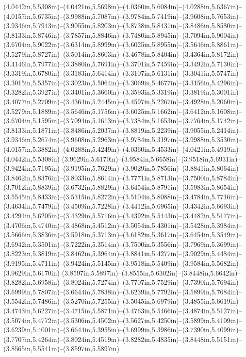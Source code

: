 (4.0442in,5.5308in)--(4.0421in,5.5698in)--(4.0360in,5.6084in)--(4.0288in,5.6367in)--(4.0157in,5.6735in)--(3.9988in,5.7087in)--(3.9784in,5.7419in)--(3.9608in,5.7653in)--(3.9346in,5.7943in)--(3.9055in,5.8203in)--(3.8738in,5.8431in)--(3.8486in,5.8580in)--(3.8133in,5.8746in)--(3.7857in,5.8846in)--(3.7480in,5.8945in)--(3.7094in,5.9004in)--(3.6704in,5.9022in)--(3.6314in,5.8999in)--(3.6025in,5.8955in)--(3.5646in,5.8861in)--(3.5279in,5.8727in)--(3.5014in,5.8603in)--(3.4678in,5.8404in)--(3.4364in,5.8172in)--(3.4146in,5.7977in)--(3.3880in,5.7691in)--(3.3701in,5.7459in)--(3.3492in,5.7130in)--(3.3319in,5.6780in)--(3.3183in,5.6414in)--(3.3107in,5.6131in)--(3.3041in,5.5747in)--(3.3015in,5.5357in)--(3.3023in,5.5064in)--(3.3069in,5.4677in)--(3.3156in,5.4296in)--(3.3282in,5.3927in)--(3.3401in,5.3660in)--(3.3593in,5.3319in)--(3.3819in,5.3001in)--(3.4077in,5.2709in)--(3.4364in,5.2445in)--(3.4597in,5.2267in)--(3.4928in,5.2060in)--(3.5279in,5.1889in)--(3.5646in,5.1756in)--(3.6025in,5.1662in)--(3.6412in,5.1608in)--(3.6704in,5.1595in)--(3.7094in,5.1613in)--(3.7384in,5.1653in)--(3.7764in,5.1742in)--(3.8133in,5.1871in)--(3.8486in,5.2037in)--(3.8819in,5.2239in)--(3.9055in,5.2414in)--(3.9346in,5.2674in)--(3.9608in,5.2963in)--(3.9784in,5.3197in)--(3.9988in,5.3530in)--(4.0157in,5.3882in)--(4.0288in,5.4249in)--(4.0360in,5.4533in)--(4.0421in,5.4919in)--(4.0442in,5.5308in) (3.9629in,5.6170in)--(3.9584in,5.6658in)--(3.9518in,5.6931in)--(3.9424in,5.7195in)--(3.9195in,5.7629in)--(3.9029in,5.7856in)--(3.8841in,5.8064in)--(3.8462in,5.8376in)--(3.8033in,5.8614in)--(3.7771in,5.8713in)--(3.7500in,5.8784in)--(3.7012in,5.8839in)--(3.6732in,5.8829in)--(3.6454in,5.8791in)--(3.5983in,5.8654in)--(3.5545in,5.8433in)--(3.5315in,5.8272in)--(3.5104in,5.8088in)--(3.4784in,5.7716in)--(3.4634in,5.7479in)--(3.4509in,5.7228in)--(3.4412in,5.6965in)--(3.4342in,5.6693in)--(3.4291in,5.6205in)--(3.4329in,5.5716in)--(3.4392in,5.5443in)--(3.4482in,5.5177in)--(3.4706in,5.4740in)--(3.4868in,5.4512in)--(3.5054in,5.4301in)--(3.5428in,5.3984in)--(3.5666in,5.3836in)--(3.5918in,5.3713in)--(3.6182in,5.3617in)--(3.6454in,5.3549in)--(3.6942in,5.3501in)--(3.7222in,5.3514in)--(3.7500in,5.3556in)--(3.7969in,5.3699in)--(3.8223in,5.3819in)--(3.8462in,5.3964in)--(3.8841in,5.4277in)--(3.9029in,5.4484in)--(3.9195in,5.4711in)--(3.9424in,5.5145in)--(3.9518in,5.5409in)--(3.9584in,5.5682in)--(3.9629in,5.6170in) (3.8597in,5.5897in)--(3.8555in,5.6302in)--(3.8448in,5.6642in)--(3.8282in,5.6958in)--(3.8024in,5.7274in)--(3.7707in,5.7529in)--(3.7390in,5.7694in)--(3.6999in,5.7807in)--(3.6644in,5.7838in)--(3.6239in,5.7792in)--(3.5899in,5.7684in)--(3.5542in,5.7486in)--(3.5270in,5.7255in)--(3.5045in,5.6979in)--(3.4855in,5.6619in)--(3.4743in,5.6227in)--(3.4715in,5.5871in)--(3.4763in,5.5466in)--(3.4874in,5.5127in)--(3.5074in,5.4772in)--(3.5306in,5.4502in)--(3.5627in,5.4250in)--(3.5899in,5.4109in)--(3.6239in,5.4001in)--(3.6644in,5.3955in)--(3.6999in,5.3986in)--(3.7390in,5.4099in)--(3.7707in,5.4264in)--(3.8024in,5.4519in)--(3.8282in,5.4835in)--(3.8448in,5.5151in)--(3.8565in,5.5541in)--(3.8597in,5.5897in) 